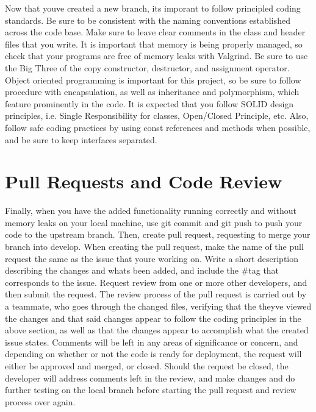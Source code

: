 Now that you\textquotesingle{}ve created a new branch, it\textquotesingle{}s imporant to follow principled coding standards. Be sure to be consistent with the naming conventions established across the code base. Make sure to leave clear comments in the class and header files that you write. It is important that memory is being properly managed, so check that your programs are free of memory leaks with Valgrind. Be sure to use the \textquotesingle{}Big Three\textquotesingle{} of the copy constructor, destructor, and assignment operator. Object oriented programming is important for this project, so be sure to follow procedure with encapsulation, as well as inheritance and polymorphism, which feature prominently in the code. It is expected that you follow S\+O\+L\+ID design principles, i.\+e. Single Responsibility for classes, Open/\+Closed Principle, etc. Also, follow safe coding practices by using const references and methods when possible, and be sure to keep interfaces separated.\hypertarget{how_to_contribute_pull_requests}{}\section{Pull Requests and Code Review}\label{how_to_contribute_pull_requests}
Finally, when you have the added functionality running correctly and without memory leaks on your local machine, use \textquotesingle{}git commit\textquotesingle{} and \textquotesingle{}git push\textquotesingle{} to push your code to the upstream branch. Then, create pull request, requesting to merge your branch into develop. When creating the pull request, make the name of the pull request the same as the issue that you\textquotesingle{}re working on. Write a short description describing the changes and what\textquotesingle{}s been added, and include the \#tag that corresponds to the issue. Request review from one or more other developers, and then submit the request. The review process of the pull request is carried out by a teammate, who goes through the changed files, verifying that the they\textquotesingle{}ve viewed the changes and that said changes appear to follow the coding principles in the above section, as well as that the changes appear to accomplish what the created issue states. Comments will be left in any areas of significance or concern, and depending on whether or not the code is ready for deployment, the request will either be approved and merged, or closed. Should the request be closed, the developer will address comments left in the review, and make changes and do further testing on the local branch before starting the pull request and review process over again. 
